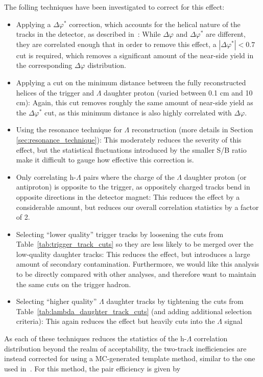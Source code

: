 The folling techniques have been investigated to correct for this effect:
%
\begin{itemize}
	\item Applying a $\Delta\varphi^{*}$ correction, which accounts for the helical nature of the tracks in the detector, as described in~\cite{DphiStar}: While $\Delta\varphi$ and $\Delta\varphi^{*}$ are different, they are correlated enough that in order to remove this effect, a $|\Delta\varphi^{*}| < 0.7$ cut is required, which removes a significant amount of the near-side yield in the corresponding $\Delta\varphi$ distribution.
	\item Applying a cut on the minimum distance between the fully reconstructed helices of the trigger and $\Lambda$ daughter proton (varied between 0.1 cm and 10 cm): Again, this cut removes roughly the same amount of near-side yield as the $\Delta\varphi^{*}$ cut, as this minimum distance is also highly correlated with $\Delta\varphi$.
	\item Using the resonance technique for $\Lambda$ reconstruction (more details in Section \ref{sec:resonance_technique}): This moderately reduces the severity of this effect, but the statistical fluctuations introduced by the smaller S/B ratio make it difficult to gauge how effective this correction is.
	\item Only correlating h-$\Lambda$ pairs where the charge of the $\Lambda$ daughter proton (or antiproton) is opposite to the trigger, as oppositely charged tracks bend in opposite directions in the detector magnet: This reduces the effect by a considerable amount, but reduces our overall correlation statistics by a factor of 2.
	\item Selecting ``lower quality'' trigger tracks by loosening the cuts from Table~\ref{tab:trigger_track_cuts} so they are less likely to be merged over the low-quality daughter tracks: This reduces the effect, but introduces a large amount of secondary contamination. Furthermore, we would like this analysis to be directly compared with other analyses, and therefore want to maintain the same cuts on the trigger hadron.
	\item Selecting ``higher quality'' $\Lambda$ daughter tracks by tightening the cuts from Table~\ref{tab:lambda_daughter_track_cuts} (and adding additional selection criteria): This again reduces the effect but heavily cuts into the $\Lambda$ signal
\end{itemize}
%
As each of these techniques reduces the statistics of the h-$\Lambda$ correlation distribution beyond the realm of acceptability, the two-track inefficiencies are instead corrected for using a MC-generated template method, similar to the one used in~\cite{TwoTrack2}. For this method, the pair efficiency is given by
